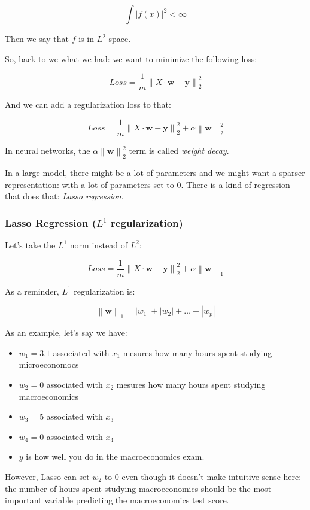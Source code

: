 \documentclass{article}
\theoremstyle{problemstyle}
\begin{document}
\[
  \int \left\lvert f(x) \right\rvert ^{2} < \infty
\]

Then we say that $f$ is in $L^2$ space.

So, back to we what we had: we want to minimize the following loss:

\[
  Loss = \frac{1}{m} \left\lVert X \cdot \textbf{w} - \textbf{y} \right\rVert_2 ^{2}
\]

And we can add a regularization loss to that:

\[
  Loss = \frac{1}{m} \left\lVert X \cdot \textbf{w} - \textbf{y} \right\rVert_2 ^{2} + \alpha \left\lVert \textbf{w} \right\rVert_2 ^{2}
\]

In neural networks, the $\alpha \left\lVert \textbf{w} \right\rVert_2 ^{2}$ term is called \emph{weight decay}.

In a large model, there might be a lot of parameters and we might want a sparser representation: with a lot of parameters set to $0$. There is a kind of regression that does that: \emph{Lasso regression}.

\subsubsection{Lasso Regression ($L^1$ regularization)}

Let's take the $L^1$ norm instead of $L^2$:

\[
  Loss = \frac{1}{m} \left\lVert X \cdot \textbf{w} - \textbf{y} \right\rVert_2 ^{2} + \alpha \left\lVert \textbf{w} \right\rVert_1
\]

As a reminder, $L^1$ regularization is:

\[
  \left\lVert \textbf{w} \right\rVert_1 = \left\lvert w_1 \right\rvert + \left\lvert w_2 \right\rvert + \dots + \left\lvert w_p \right\rvert 
\]

As an example, let's say we have:
\begin{itemize}
  \item $w_1 = 3.1$ associated with $x_1$ mesures how many hours spent studying microeconomocs
  \item $w_2 = 0$ associated with $x_2$ mesures how many hours spent studying macroeconomics
  \item $w_3 = 5$ associated with $x_3$
  \item $w_4 = 0$ associated with $x_4$
  \item $y$ is how well you do in the macroeconomics exam.
\end{itemize}

However, Lasso can set $w_2$ to $0$ even though it doesn't make intuitive sense here: the number of hours spent studying macroeconomics should be the most important variable predicting the macroeconomics test score. 
\end{document}
